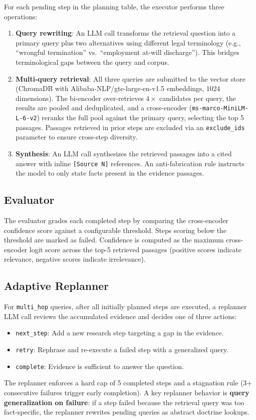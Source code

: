 \documentclass{article}
\begin{document}
For each pending step in the planning table, the executor performs three operations:

\begin{enumerate}[leftmargin=*,nosep]
    \item \textbf{Query rewriting}: An LLM call transforms the retrieval question into a primary query plus two alternatives using different legal terminology (e.g., ``wrongful termination'' vs.\ ``employment at-will discharge''). This bridges terminological gaps between the query and corpus.
    \item \textbf{Multi-query retrieval}: All three queries are submitted to the vector store (ChromaDB with Alibaba-NLP/gte-large-en-v1.5 embeddings, 1024 dimensions). The bi-encoder over-retrieves $4\times$ candidates per query, the results are pooled and deduplicated, and a cross-encoder (\texttt{ms-marco-MiniLM-L-6-v2}) reranks the full pool against the primary query, selecting the top 5 passages. Passages retrieved in prior steps are excluded via an \texttt{exclude\_ids} parameter to ensure cross-step diversity.
    \item \textbf{Synthesis}: An LLM call synthesizes the retrieved passages into a cited answer with inline \texttt{[Source~N]} references. An anti-fabrication rule instructs the model to only state facts present in the evidence passages.
\end{enumerate}

\subsection{Evaluator}

The evaluator grades each completed step by comparing the cross-encoder confidence score against a configurable threshold. Steps scoring below the threshold are marked as failed. Confidence is computed as the maximum cross-encoder logit score across the top-5 retrieved passages (positive scores indicate relevance, negative scores indicate irrelevance).

\subsection{Adaptive Replanner}

For \texttt{multi\_hop} queries, after all initially planned steps are executed, a replanner LLM call reviews the accumulated evidence and decides one of three actions:
\begin{itemize}[leftmargin=*,nosep]
    \item \texttt{next\_step}: Add a new research step targeting a gap in the evidence.
    \item \texttt{retry}: Rephrase and re-execute a failed step with a generalized query.
    \item \texttt{complete}: Evidence is sufficient to answer the question.
\end{itemize}
The replanner enforces a hard cap of 5 completed steps and a stagnation rule (3+ consecutive failures trigger early completion). A key replanner behavior is \textbf{query generalization on failure}: if a step failed because the retrieval query was too fact-specific, the replanner rewrites pending queries as abstract doctrine lookups.
\end{document}
